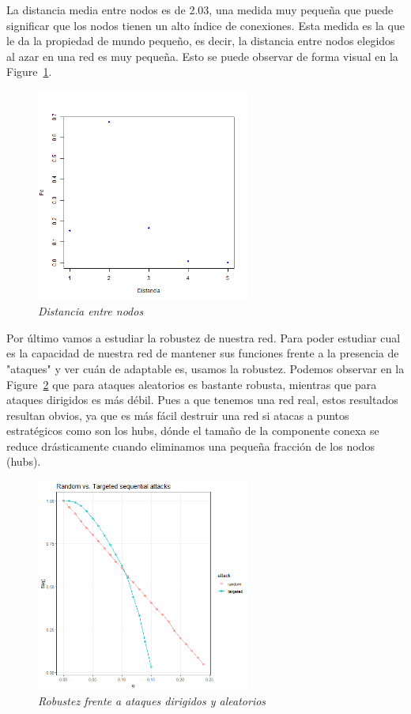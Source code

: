 La distancia media entre nodos es de 2.03, una medida muy pequeña que puede significar que los nodos tienen un alto índice de conexiones. Esta medida es la que le da la propiedad de mundo pequeño, es decir, la distancia entre nodos elegidos al azar en una red es muy pequeña. Esto se puede observar de forma visual en la Figure~\ref{distance}.

\begin{figure}[h]
	\centering
		\includegraphics[width=70mm,scale=1.2]{figures/distancia.png}
		\caption{\textit{Distancia entre nodos}}
		\label{distance}	
\end{figure}

Por último vamos a estudiar la robustez de nuestra red. Para poder estudiar cual es la capacidad de nuestra red de mantener sus funciones frente a la presencia de "ataques" y ver cuán de adaptable es, usamos la robustez. Podemos observar en la Figure~\ref{ataques} que para ataques aleatorios es bastante robusta, mientras que para ataques dirigidos es más débil. Pues a que tenemos una red real, estos resultados resultan obvios, ya que es más fácil destruir una red si atacas a puntos estratégicos como son los hubs, dónde el tamaño de la componente conexa se reduce drásticamente cuando eliminamos una pequeña fracción de los nodos (hubs). 

\begin{figure}[h]
	\centering
	\includegraphics[width=70mm,scale=1.2]{figures/sequential_attacks.png}
	\caption{\textit{Robustez frente a ataques dirigidos y aleatorios}}
	\label{ataques}
\end{figure}

